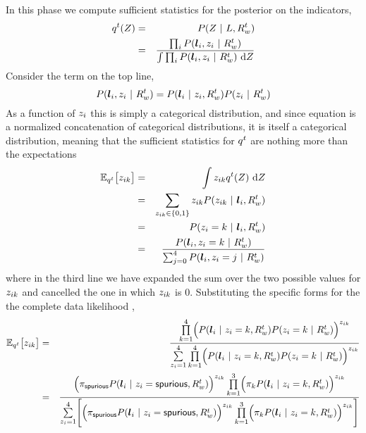 In this phase we compute sufficient statistics for the posterior on
the indicators,
\begin{eqnarray}
  \PosteriorEst^t(\Indicators) &=&
    P(\Indicators ~|~ \LineSegs,\SceneR^t) \\
  \label{eq:posterior-est}
  &=&
    \frac{
      \prod_i P(\LineSeg_i,\Indicator_i ~|~\SceneR^t)
    }{
      \int \prod_i P(\LineSeg_i,\Indicator_i ~|~ \SceneR^t)
      ~\intd\Indicators
    }\\
\end{eqnarray}
Consider the term on the top line,
\begin{equation}
  P(\LineSeg_i,\Indicator_i ~|~\SceneR^t)
  =
  P(\LineSeg_i ~|~ \Indicator_i,\SceneR^t)
  P(\Indicator_i ~|~ \SceneR^t)
\end{equation}
As a function of $\Indicator_i$ this is simply a categorical
distribution, and since equation  is a
normalized concatenation of categorical distributions, it is
itself a categorical distribution, meaning that the sufficient
statistics for $\PosteriorEst^t$ are nothing more than the
expectations
\begin{eqnarray}
  \Expected_{\PosteriorEst^t}\bigl[ \Indicator_{ik} \bigr]
  &=& 
    \int \Indicator_{ik} \PosteriorEst^t(\Indicators) ~\intd\Indicators \\
  &=& 
    \sum_{\Indicator_{ik}\in\{0,1\}}
    \Indicator_{ik} P(\Indicator_{ik} ~|~ \LineSeg_i, \SceneR^t)\\
  &=&
    P(\Indicator_i=k ~|~ \LineSeg_i, \SceneR^t)\\
  &=&
    \label{eq:expected-zik}
    \frac
        {P( \LineSeg_i, \Indicator_i=k ~|~ \SceneR^t)}
        {\sum_{j=0}^4 P(\LineSeg_i, \Indicator_i=j ~|~ \SceneR^t)}
\end{eqnarray}
where in the third line we have expanded the sum over the two possible
values for $\Indicator_{ik}$ and cancelled the one in which
$\Indicator_{ik}$ is 0. Substituting the specific forms for the the
complete data likelihood ,
\begin{eqnarray}
  \Expected_{\PosteriorEst^t}\bigl[ \Indicator_{ik} \bigr] 
  &=&
  \frac{
    \prod_{k=1}^4\limits \Bigl( 
      P(\LineSeg_i ~|~ \Indicator_i=k,\SceneR^t)
      P(\Indicator_i=k ~|~ \SceneR^t)
    \Bigr)^{\Indicator_{ik}}
  }{
    \sum_{\Indicator_i=1}^4\limits
    \prod_{k=1}^4\limits \Bigl( 
      P(\LineSeg_i ~|~ \Indicator_i=k,\SceneR^t)
      P(\Indicator_i=k ~|~ \SceneR^t)
    \Bigr)^{\Indicator_{ik}}
  }\\
  \label{eq:big-expectation}
  &=&
  \frac{
    \Bigl(
      \Mixing_{\Spurious}
      P(\LineSeg_i ~|~ \Indicator_i=\Spurious,\SceneR^t)
    \Bigr)^{\Indicator_{ik}}
    \prod_{k=1}^3\limits \Bigl(
      \Mixing_k
      P(\LineSeg_i ~|~ \Indicator_i=k,\SceneR^t)
    \Bigr)^{\Indicator_{ik}}
  }{
    \sum_{\Indicator_i=1}^4\limits \Biggl[
    \Bigl(
      \Mixing_{\Spurious}
      P(\LineSeg_i ~|~ \Indicator_i=\Spurious,\SceneR^t)
    \Bigr)^{\Indicator_{ik}}
    \prod_{k=1}^3\limits \Bigl( 
      \Mixing_k
      P(\LineSeg_i ~|~ \Indicator_i=k,\SceneR^t)
    \Bigr)^{\Indicator_{ik}}
    \Biggr]
  }
\end{eqnarray}
